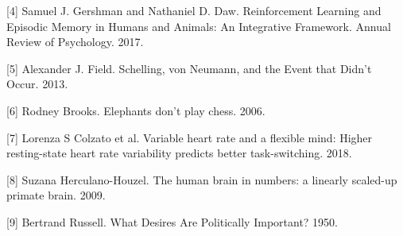 \documentclass{article}
\begin{document}
[4] Samuel J. Gershman and Nathaniel D. Daw. Reinforcement Learning and Episodic Memory in Humans and Animals: An Integrative Framework. Annual Review of Psychology. 2017.

[5] Alexander J. Field. Schelling, von Neumann, and the Event that Didn’t Occur. 2013.

[6] Rodney Brooks. Elephants don’t play chess. 2006.

[7] Lorenza S Colzato et al. Variable heart rate and a flexible mind: Higher resting-state heart rate variability predicts better task-switching. 2018.

[8] Suzana Herculano-Houzel. The human brain in numbers: a linearly scaled-up primate brain. 2009.

[9] Bertrand Russell. What Desires Are Politically Important? 1950. 
\end{document}
